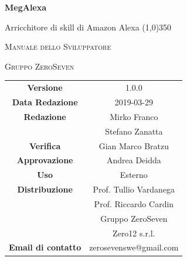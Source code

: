 \documentclass[a4paper,12pt,openany]{book}
\author{Ludovico Brocca}
\date{2018-12-19}
\begin{document}
\begin{titlepage}
	\centering
	{\huge\bfseries MegAlexa \par}
	Arricchitore di skill di Amazon Alexa
	\line(1,0){350} \\
	{\scshape\LARGE Manuale dello Sviluppatore \par}
	\vspace{1cm}
	{\scshape Gruppo ZeroSeven \par}
	\logo
	\begin{tabular}{c|c}
		{\hfill \textbf{Versione}} 			& 1.0.0	\\
		{\hfill\textbf{Data Redazione}} 	& 2019-03-29	\\ 
		{\hfill\textbf{Redazione}} 	& Mirko Franco \\ & Stefano Zanatta \\
		{\hfill\textbf{Verifica}} 				&  	Gian Marco Bratzu \\
		{\hfill\textbf{Approvazione}} 		&  	Andrea Deidda \\
		{\hfill\textbf{Uso}} 					& 		Esterno		\\ 
		{\hfill\textbf{Distribuzione}} 			& 			Prof. Tullio Vardanega \\ & Prof. Riccardo Cardin \\ & Gruppo ZeroSeven	\\ & Zero12 s.r.l. \\
		{\hfill\textbf{Email di contatto}} & zerosevenswe@gmail.com \\
	\end{tabular}
\end{titlepage}
	
	\label{LastFrontPage}
	\newpage	
	
	\pagestyle{mymain}
	\tableofcontents
	\listoffigures
	
	
	
	
	
	
	\appendix
	
	\label{LastPage}
\end{document}
